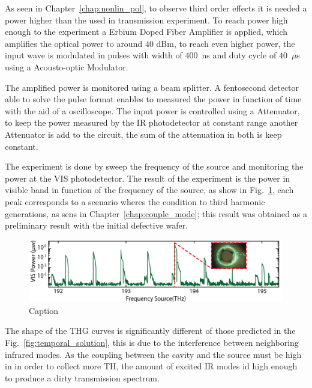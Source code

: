 As seen in Chapter~\ref{chap:nonlin_pol}, to observe third order effects it is needed a power higher than the used in transmission experiment. To reach power high enough to the experiment a Erbium Doped Fiber Amplifier is applied, which amplifies the optical power to around $40$ dBm, to reach even higher power, the input wave is modulated in pulses with width of $400$~ns and duty cycle of $40$~$\mu$s using a Acousto-optic Modulator. 

The amplified power is monitored using a beam splitter. A fentosecond detector able to solve the pulse format enables to measured the power in function of time with the aid of a oscilloscope. The input power is controlled using a Attenuator, to keep the power measured by the IR photodetector at constant range another Attenuator is add to the circuit, the sum of the attenuation in both is keep constant.  

The experiment is done by sweep the frequency of the source and monitoring the power at the VIS photodetector. The result of the experiment is the power in visible band in function of the frequency of the source, as show in Fig.~\ref{fig:thg_broad_map}, each peak corresponds to a scenario wheres the condition to third harmonic generations, as sens in Chapter~\ref{chap:couple_mode}; this result was obtained as a preliminary result with the initial defective wafer. 
\begin{figure}[h]
    \centering
    \includegraphics[width = 16cm]{figuras/Dissertation_thg_broad.jpg}
    \caption{Caption}
    \label{fig:thg_broad_map}
\end{figure}

The shape of the THG curves is significantly different of those predicted in the Fig.~\ref{fig:temporal_solution}, this is due to the interference between neighboring infrared modes. As the coupling between the cavity and the source must be high in in order to collect more TH, the amount of excited IR modes id high enough to produce a dirty transmission spectrum. 

